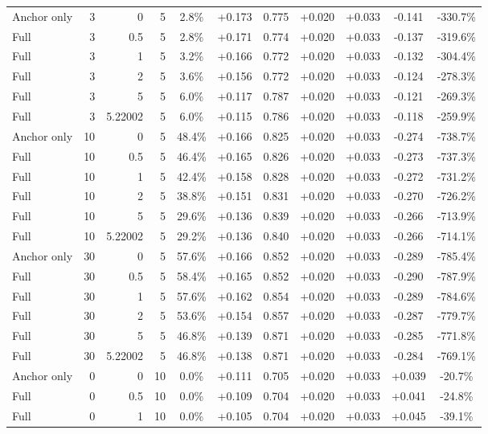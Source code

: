\begin{table}[htbp]
\begin{tabular}{lrrrccccccc}
Anchor only & 3 & 0 & 5 & 2.8\% & +0.173 & 0.775 & +0.020 & +0.033 & -0.141 & -330.7\% \\
Full & 3 & 0.5 & 5 & 2.8\% & +0.171 & 0.774 & +0.020 & +0.033 & -0.137 & -319.6\% \\
Full & 3 & 1 & 5 & 3.2\% & +0.166 & 0.772 & +0.020 & +0.033 & -0.132 & -304.4\% \\
Full & 3 & 2 & 5 & 3.6\% & +0.156 & 0.772 & +0.020 & +0.033 & -0.124 & -278.3\% \\
Full & 3 & 5 & 5 & 6.0\% & +0.117 & 0.787 & +0.020 & +0.033 & -0.121 & -269.3\% \\
Full & 3 & 5.22002 & 5 & 6.0\% & +0.115 & 0.786 & +0.020 & +0.033 & -0.118 & -259.9\% \\
Anchor only & 10 & 0 & 5 & 48.4\% & +0.166 & 0.825 & +0.020 & +0.033 & -0.274 & -738.7\% \\
Full & 10 & 0.5 & 5 & 46.4\% & +0.165 & 0.826 & +0.020 & +0.033 & -0.273 & -737.3\% \\
Full & 10 & 1 & 5 & 42.4\% & +0.158 & 0.828 & +0.020 & +0.033 & -0.272 & -731.2\% \\
Full & 10 & 2 & 5 & 38.8\% & +0.151 & 0.831 & +0.020 & +0.033 & -0.270 & -726.2\% \\
Full & 10 & 5 & 5 & 29.6\% & +0.136 & 0.839 & +0.020 & +0.033 & -0.266 & -713.9\% \\
Full & 10 & 5.22002 & 5 & 29.2\% & +0.136 & 0.840 & +0.020 & +0.033 & -0.266 & -714.1\% \\
Anchor only & 30 & 0 & 5 & 57.6\% & +0.166 & 0.852 & +0.020 & +0.033 & -0.289 & -785.4\% \\
Full & 30 & 0.5 & 5 & 58.4\% & +0.165 & 0.852 & +0.020 & +0.033 & -0.290 & -787.9\% \\
Full & 30 & 1 & 5 & 57.6\% & +0.162 & 0.854 & +0.020 & +0.033 & -0.289 & -784.6\% \\
Full & 30 & 2 & 5 & 53.6\% & +0.154 & 0.857 & +0.020 & +0.033 & -0.287 & -779.7\% \\
Full & 30 & 5 & 5 & 46.8\% & +0.139 & 0.871 & +0.020 & +0.033 & -0.285 & -771.8\% \\
Full & 30 & 5.22002 & 5 & 46.8\% & +0.138 & 0.871 & +0.020 & +0.033 & -0.284 & -769.1\% \\
Anchor only & 0 & 0 & 10 & 0.0\% & +0.111 & 0.705 & +0.020 & +0.033 & +0.039 & -20.7\% \\
Full & 0 & 0.5 & 10 & 0.0\% & +0.109 & 0.704 & +0.020 & +0.033 & +0.041 & -24.8\% \\
Full & 0 & 1 & 10 & 0.0\% & +0.105 & 0.704 & +0.020 & +0.033 & +0.045 & -39.1\% \\

\end{tabular}
\end{table}
